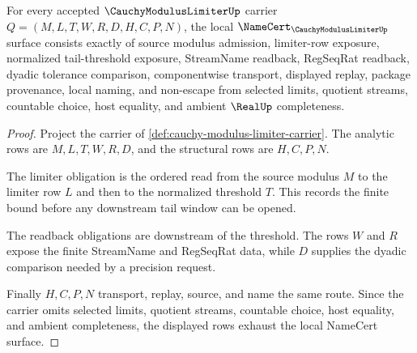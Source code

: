 \begin{theorem}
\label{thm:cauchy-modulus-limiter-namecert-obligations}
For every accepted $\CauchyModulusLimiterUp$ carrier $Q=(M,L,T,W,R,D,H,C,P,N)$, the local $\NameCert_{\CauchyModulusLimiterUp}$ surface consists exactly of source modulus admission, limiter-row exposure, normalized tail-threshold exposure, StreamName readback, RegSeqRat readback, dyadic tolerance comparison, componentwise transport, displayed replay, package provenance, local naming, and non-escape from selected limits, quotient streams, countable choice, host equality, and ambient $\RealUp$ completeness.
\end{theorem}
\begin{proof}
Project the carrier of \autoref{def:cauchy-modulus-limiter-carrier}. The analytic rows are $M,L,T,W,R,D$, and the structural rows are $H,C,P,N$.

The limiter obligation is the ordered read from the source modulus $M$ to the limiter row $L$ and then to the normalized threshold $T$. This records the finite bound before any downstream tail window can be opened.

The readback obligations are downstream of the threshold. The rows $W$ and $R$ expose the finite StreamName and RegSeqRat data, while $D$ supplies the dyadic comparison needed by a precision request.

Finally $H,C,P,N$ transport, replay, source, and name the same route. Since the carrier omits selected limits, quotient streams, countable choice, host equality, and ambient completeness, the displayed rows exhaust the local NameCert surface.
\end{proof}

